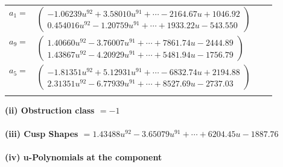 \documentclass[1p]{elsarticle_modified}
\theoremstyle{definition}
\begin{document}
\begin{tabular}{m{7pt} m{180pt} m{7pt} m{180pt} }
\flushright $a_{1}=$&$\begin{pmatrix}-1.06239 u^{92}+3.58010 u^{91}+\cdots-2164.67 u+1046.92\\0.454016 u^{92}-1.20759 u^{91}+\cdots+1933.22 u-543.550\end{pmatrix}$ \\
\flushright $a_{9}=$&$\begin{pmatrix}1.40660 u^{92}-3.76007 u^{91}+\cdots+7861.74 u-2444.89\\1.43867 u^{92}-4.20929 u^{91}+\cdots+5481.94 u-1756.79\end{pmatrix}$ \\
\flushright $a_{5}=$&$\begin{pmatrix}-1.81351 u^{92}+5.12931 u^{91}+\cdots-6832.74 u+2194.88\\2.31351 u^{92}-6.77939 u^{91}+\cdots+8527.69 u-2737.03\end{pmatrix}$\\&\end{tabular}
\flushleft \textbf{(ii) Obstruction class $= -1$}\\~\\
\flushleft \textbf{(iii) Cusp Shapes $= 1.43488 u^{92}-3.65079 u^{91}+\cdots+6204.45 u-1887.76$}\\~\\
\newpage\renewcommand{\arraystretch}{1}
\flushleft \textbf{(iv) u-Polynomials at the component}\newline \\
\end{document}
